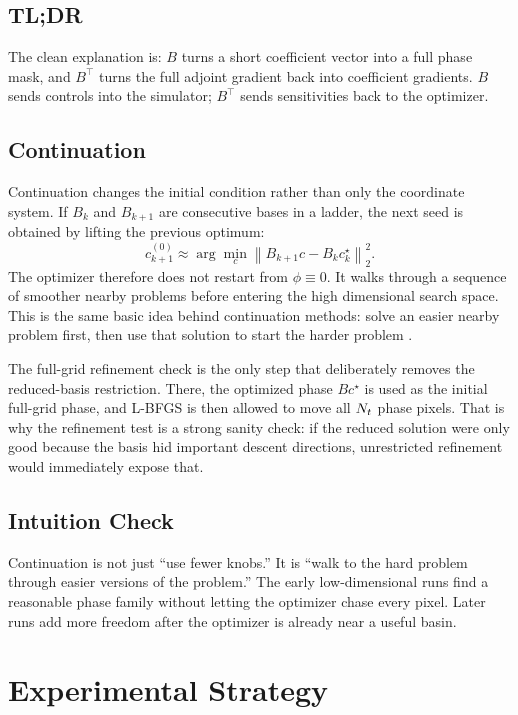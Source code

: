 \documentclass[11pt]{article}
\begin{document}
\subsection*{TL;DR}

The clean explanation is: \(B\) turns a short coefficient vector into a full
phase mask, and \(B^\top\) turns the full adjoint gradient back into
coefficient gradients. \(B\) sends controls into the simulator; \(B^\top\)
sends sensitivities back to the optimizer.

\subsection*{Continuation}

Continuation changes the initial condition rather than only the coordinate
system. If \(B_k\) and \(B_{k+1}\) are consecutive bases in a ladder, the next
seed is obtained by lifting the previous optimum:
\[
    c_{k+1}^{(0)}
    \approx \arg\min_c \left\| B_{k+1}c - B_k c_k^\star \right\|_2^2 .
\]
The optimizer therefore does not restart from \(\phi \equiv 0\). It walks
through a sequence of smoother nearby problems before entering the high
dimensional search space. This is the same basic idea behind continuation
methods: solve an easier nearby problem first, then use that solution to start
the harder problem \cite{allgower1990}.

The full-grid refinement check is the only step that deliberately removes the
reduced-basis restriction. There, the optimized phase \(Bc^\star\) is used as
the initial full-grid phase, and L-BFGS is then allowed to move all \(N_t\)
phase pixels. That is why the refinement test is a strong sanity check: if the
reduced solution were only good because the basis hid important descent
directions, unrestricted refinement would immediately expose that.

\subsection*{Intuition Check}

Continuation is not just ``use fewer knobs.'' It is ``walk to the hard problem
through easier versions of the problem.'' The early low-dimensional runs find a
reasonable phase family without letting the optimizer chase every pixel. Later
runs add more freedom after the optimizer is already near a useful basin.

\section{Experimental Strategy}
\end{document}
